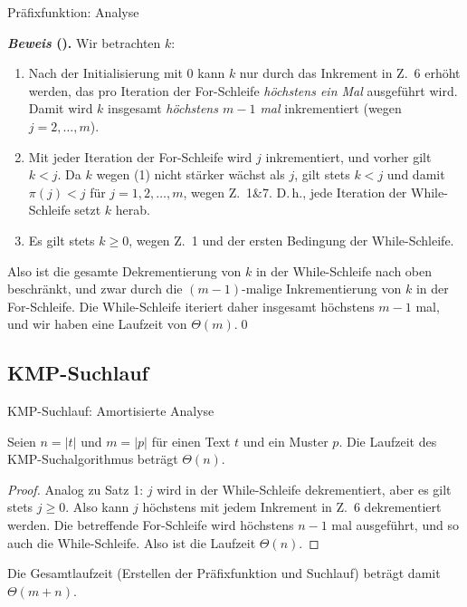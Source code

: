 \documentclass[xcolor=dvipsnames, aspectratio=169]{beamer}
\begin{document}
\begin{frame}{Präfixfunktion: Analyse}
\begin{small}
\textbf{\textit{Beweis} (\cite{cormenalgorithms2009}).}
Wir betrachten $k$: 
\begin{enumerate}[(1)]
\item Nach der Initialisierung mit $0$ kann $k$ nur durch das Inkrement in Z.\ 6 erhöht werden, das pro Iteration der For-Schleife \emph{höchstens ein Mal} ausgeführt wird. Damit wird $k$ insgesamt \emph{höchstens $m-1$ mal} inkrementiert (wegen $j=2,\dots,m$).\pause
\item Mit jeder Iteration der For-Schleife wird $j$ inkrementiert, und vorher gilt $k<j$. Da $k$ wegen (1) nicht stärker wächst als $j$, gilt stets $k<j$ und damit $\pi(j)<j$ für $j=1,2,\dots,m$, wegen Z.\ 1\&7. D.\,h., jede Iteration der While-Schleife setzt $k$ herab.\pause
\item Es gilt stets $k\geq 0$, wegen Z.\ 1 und der ersten Bedingung der While-Schleife.
\end{enumerate}\pause
Also ist die gesamte Dekrementierung von $k$ in der While-Schleife nach oben beschränkt, und zwar durch die $(m-1)$-malige Inkrementierung von $k$ in der For-Schleife. Die While-Schleife iteriert daher insgesamt höchstens $m-1$ mal, und wir haben eine Laufzeit von $\Theta(m)$.\qed
\end{small}
\end{frame}

\subsection{KMP-Suchlauf}


\begin{frame}{KMP-Suchlauf: Amortisierte Analyse}
\begin{theo}
Seien $n=\vert t\vert$ und $m=\vert p\vert$ für einen Text $t$ und ein Muster $p$. Die Laufzeit des KMP-Suchalgorithmus beträgt $\Theta(n)$.
\end{theo}
\begin{small}
\begin{proof}
Analog zu Satz 1: $j$ wird in der While-Schleife dekrementiert, aber es gilt stets $j\geq 0$. Also kann $j$ höchstens mit jedem Inkrement in Z.\ 6 dekrementiert werden. Die betreffende For-Schleife wird höchstens $n-1$ mal ausgeführt, und so auch die While-Schleife. Also ist die Laufzeit $\Theta(n)$.
\end{proof}\pause

Die Gesamtlaufzeit (Erstellen der Präfixfunktion und Suchlauf) beträgt damit $\Theta(m+n)$.
\end{small}
\end{frame}
\end{document}

